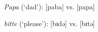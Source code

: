 \documentclass[output=paper]{langsci/langscibook}
\begin{document}
%
%

 
\ea
\label{ex:stuhl:10}  
\textit{Papa} (‘dad’): {[paba]} vs. {[papa]}
\z
 
\ea
\label{ex:stuhl:11}  
{\textit{bitte}} (‘please’): {[bɪd{ə}]} vs. {[bɪtə]} 
\z
 
\end{document}
